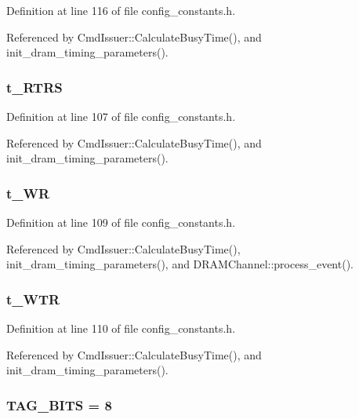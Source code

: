 Definition at line 116 of file config\_\-constants.h.

Referenced by CmdIssuer::CalculateBusyTime(), and init\_\-dram\_\-timing\_\-parameters().
\subsubsection[{t\_\-RTRS}]{ {\bf t\_\-RTRS}}\label{config__constants_8h_878d3dc90fd5fee1108c736ad43d7607}




Definition at line 107 of file config\_\-constants.h.

Referenced by CmdIssuer::CalculateBusyTime(), and init\_\-dram\_\-timing\_\-parameters().
\subsubsection[{t\_\-WR}]{ {\bf t\_\-WR}}\label{config__constants_8h_59cb204d6cd0bc9403224348bd724436}




Definition at line 109 of file config\_\-constants.h.

Referenced by CmdIssuer::CalculateBusyTime(), init\_\-dram\_\-timing\_\-parameters(), and DRAMChannel::process\_\-event().
\subsubsection[{t\_\-WTR}]{ {\bf t\_\-WTR}}\label{config__constants_8h_344b9b38599995882828432f63575e65}




Definition at line 110 of file config\_\-constants.h.

Referenced by CmdIssuer::CalculateBusyTime(), and init\_\-dram\_\-timing\_\-parameters().
\subsubsection[{TAG\_\-BITS}]{ {\bf TAG\_\-BITS} = 8}\label{config__constants_8h_a00203dc72b02b1b8393c16dfd7ddf0f}




